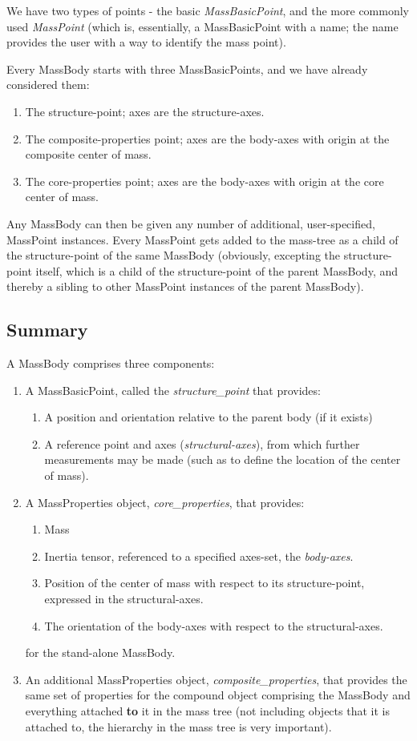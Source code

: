 We have two types of points - the basic \textit{MassBasicPoint}, and the more
commonly used \textit{MassPoint} (which is, essentially, a MassBasicPoint with
a name; the name provides the user with a way to identify the mass point).

Every MassBody starts with three MassBasicPoints, and we have already
considered them:
\begin{enumerate}
  \item The structure-point; axes are the structure-axes.
  \item The composite-properties point; axes are the body-axes with origin at
  the composite center of mass.
  \item The core-properties point; axes are the body-axes with origin at the
  core center of mass.
\end{enumerate}

Any MassBody can then be given any number of additional, user-specified,
MassPoint instances.  Every MassPoint gets added to the mass-tree as a child
of the structure-point of the same MassBody (obviously, excepting the
structure-point itself, which is a child of the structure-point of the parent
MassBody, and thereby a sibling to other MassPoint instances of the parent
MassBody).


\subsection {Summary}
A MassBody comprises three components:
\begin{enumerate}
 \item A MassBasicPoint, called the \textit{structure\_point} that provides:
 \begin{enumerate}
  \item A position and orientation relative to the parent body (if it exists)
  \item A reference point and axes (\textit{structural-axes}), from which
  further measurements may be made (such as to define the location of the
  center of mass).
 \end{enumerate}
 \item A MassProperties object, \textit{core\_properties}, that provides:
   \begin{enumerate}
   \item Mass
   \item Inertia tensor, referenced to a specified axes-set, the
   \textit{body-axes}.
   \item Position of the center of mass with respect to its structure-point,
   expressed in the structural-axes.
   \item The orientation of the body-axes with respect to the
   structural-axes.
   \end{enumerate}
   for the stand-alone MassBody.
  \item An additional MassProperties object, \textit{composite\_properties},
  that provides the same set of properties for the compound object comprising
  the MassBody and everything attached \textbf{to} it in the mass tree (not
  including objects that it is attached to, the hierarchy in the mass tree is
  very important).
\end{enumerate}